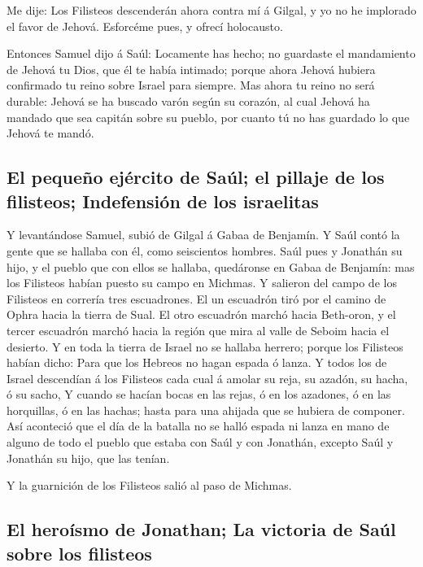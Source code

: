 Me dije: Los Filisteos descenderán ahora contra mí á
Gilgal, y yo no he implorado el favor de Jehová. Esforcéme pues, y
ofrecí holocausto.

 Entonces Samuel dijo á Saúl: Locamente has hecho; no
guardaste el mandamiento de Jehová tu Dios, que él te había intimado;
porque ahora Jehová hubiera confirmado tu reino sobre Israel para
siempre.  Mas ahora tu reino no será durable: Jehová se ha
buscado varón según su corazón, al cual Jehová ha mandado que sea
capitán sobre su pueblo, por cuanto tú no has guardado lo que Jehová te
mandó.

\hypertarget{el-pequeuxf1o-ejuxe9rcito-de-sauxfal-el-pillaje-de-los-filisteos-indefensiuxf3n-de-los-israelitas}{%
\subsection{El pequeño ejército de Saúl; el pillaje de los filisteos;
Indefensión de los
israelitas}\label{el-pequeuxf1o-ejuxe9rcito-de-sauxfal-el-pillaje-de-los-filisteos-indefensiuxf3n-de-los-israelitas}}

 Y levantándose Samuel, subió de Gilgal á Gabaa de
Benjamín. Y Saúl contó la gente que se hallaba con él, como seiscientos
hombres.  Saúl pues y Jonathán su hijo, y el pueblo que con
ellos se hallaba, quedáronse en Gabaa de Benjamín: mas los Filisteos
habían puesto su campo en Michmas.  Y salieron del campo de
los Filisteos en correría tres escuadrones. El un escuadrón tiró por el
camino de Ophra hacia la tierra de Sual.  El otro escuadrón
marchó hacia Beth-oron, y el tercer escuadrón marchó hacia la región que
mira al valle de Seboim hacia el desierto.  Y en toda la
tierra de Israel no se hallaba herrero; porque los Filisteos habían
dicho: Para que los Hebreos no hagan espada ó lanza.  Y
todos los de Israel descendían á los Filisteos cada cual á amolar su
reja, su azadón, su hacha, ó su sacho,  Y cuando se hacían
bocas en las rejas, ó en los azadones, ó en las horquillas, ó en las
hachas; hasta para una ahijada que se hubiera de componer. 
Así aconteció que el día de la batalla no se halló espada ni lanza en
mano de alguno de todo el pueblo que estaba con Saúl y con Jonathán,
excepto Saúl y Jonathán su hijo, que las tenían.

 Y la guarnición de los Filisteos salió al paso de Michmas.

\hypertarget{el-herouxedsmo-de-jonathan-la-victoria-de-sauxfal-sobre-los-filisteos}{%
\subsection{El heroísmo de Jonathan; La victoria de Saúl sobre los
filisteos}\label{el-herouxedsmo-de-jonathan-la-victoria-de-sauxfal-sobre-los-filisteos}}

